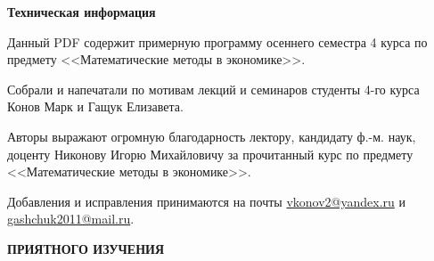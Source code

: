 \begin{center}
	{\Large \textbf{Техническая информация}}
\end{center}

\vspace{0.5cm}
Данный PDF содержит примерную программу осеннего семестра 4 курса по предмету <<Математические методы в экономике>>.

\vspace{0.5cm}
Собрали и напечатали по мотивам лекций и семинаров студенты 4-го курса Конов Марк и Гащук Елизавета.

\vspace{0.5cm}
Авторы выражают огромную благодарность лектору, кандидату ф.-м. наук, доценту Никонову Игорю Михайловичу за прочитанный курс по предмету <<Математические методы в экономике>>.

\vspace{0.5cm}
Добавления и исправления принимаются на почты \href{}{vkonov2@yandex.ru} и \\\href{}{gashchuk2011@mail.ru}.

\vspace{0.5cm}
\begin{center}
	{\Large \textbf{ПРИЯТНОГО ИЗУЧЕНИЯ}}
\end{center}

\newpage

